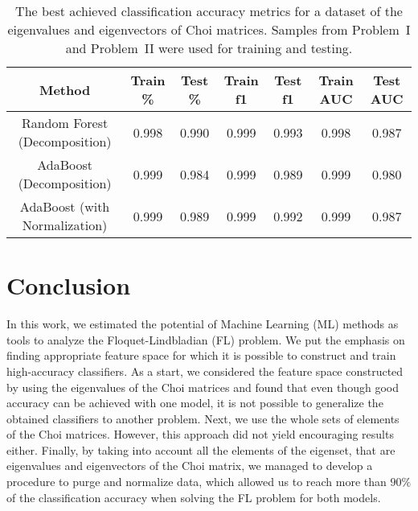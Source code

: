 \documentclass[%
 aip,
 floatfix,
 amsmath,amssymb,
 reprint,%
]{revtex4-1}
\begin{document}
\begin{table*}[]
\begin{ruledtabular}
\begin{tabular}{ccccccc}
Method                        & Train \% & Test \% & Train f1 & Test f1 & Train AUC & Test AUC \\ \hline
Random Forest (Decomposition) & 0.998    & 0.990   & 0.999    & 0.993   & 0.998     & 0.987    \\ 
AdaBoost (Decomposition)      & 0.999    & 0.984   & 0.999    & 0.989   & 0.999     & 0.980    \\ 
AdaBoost (with Normalization) & 0.999    & 0.989   & 0.999    & 0.992   & 0.999     & 0.987    \\ 
\end{tabular}
\caption{\label{tab:1}The best achieved classification accuracy metrics for a dataset of the eigenvalues and eigenvectors of Choi matrices. Samples from Problem~I and Problem~II were used for training and testing.}
\end{ruledtabular}
\end{table*}

\section{Conclusion \label{sec:6}}
In this work, we estimated the potential of Machine Learning (ML) methods as tools to analyze the Floquet-Lindbladian (FL)  problem. We put the emphasis on finding appropriate feature space for which it is possible to construct and train high-accuracy classifiers. As a start, we considered the feature space constructed by using the eigenvalues of the Choi matrices and found that even though good accuracy can be achieved with one model, it is not possible to generalize the obtained classifiers to another problem. Next, we use the whole sets of elements of the Choi matrices. However, this approach did not yield encouraging results either. Finally, by taking into account all the elements of the eigenset, that are eigenvalues and eigenvectors of the Choi matrix, we managed to develop a procedure to purge and normalize data, which allowed us to reach more than $90\%$ of the classification accuracy  when solving the FL problem for both models.

\end{document}
